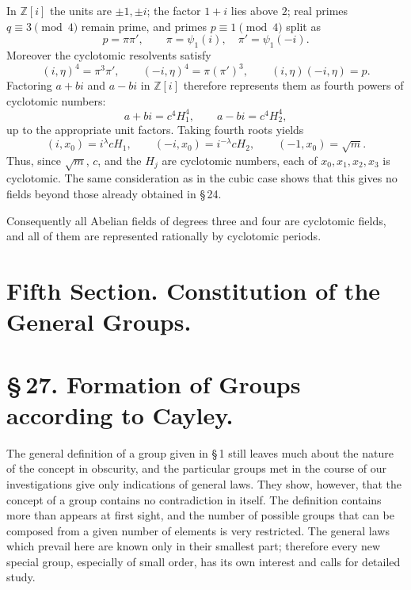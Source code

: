 \documentclass[11pt]{article}
\begin{document}
In $\mathbb Z[i]$ the units are $\pm1,\pm i$; the factor $1+i$ lies above $2$; real primes $q\equiv3\pmod4$ remain prime, and primes $p\equiv1\pmod4$ split as
\begin{equation}
  p=\pi\pi',
  \qquad
  \pi=\psi_1(i),
  \quad
  \pi'=\psi_1(-i).
  \tag{9}
\end{equation}
Moreover the cyclotomic resolvents satisfy
\begin{equation}
   (i,\eta)^4=\pi^3\pi',
   \qquad
   (-i,\eta)^4=\pi(\pi')^3,
   \qquad
   (i,\eta)(-i,
\eta)=p.
   \tag{10}
\end{equation}
Factoring $a+bi$ and $a-bi$ in $\mathbb Z[i]$ therefore represents them as fourth powers of cyclotomic numbers:
\begin{equation}
   a+bi=c^4H_1^4,
   \qquad
   a-bi=c^4H_2^4,
   \tag{11}
\end{equation}
up to the appropriate unit factors.  Taking fourth roots yields
\begin{equation}
   (i,x_0)=i^\lambda cH_1,
   \qquad
   (-i,x_0)=i^{-\lambda}cH_2,
   \qquad
   (-1,x_0)=\sqrt m.
   \tag{12}
\end{equation}
Thus, since $\sqrt m$, $c$, and the $H_j$ are cyclotomic numbers, each of
$x_0,x_1,x_2,x_3$ is cyclotomic.  The same consideration as in the cubic case shows that this gives no fields beyond those already obtained in \S\,24.

Consequently all Abelian fields of degrees three and four are cyclotomic fields, and all of them are represented rationally by cyclotomic periods.


\clearpage

\section*{Fifth Section. Constitution of the General Groups.}

\section*{\S\,27. Formation of Groups according to Cayley.}

The general definition of a group given in \S\,1 still leaves much about the nature of the concept in obscurity, and the particular groups met in the course of our investigations give only indications of general laws. They show, however, that the concept of a group contains no contradiction in itself. The definition contains more than appears at first sight, and the number of possible groups that can be composed from a given number of elements is very restricted. The general laws which prevail here are known only in their smallest part; therefore every new special group, especially of small order, has its own interest and calls for detailed study.
\end{document}
